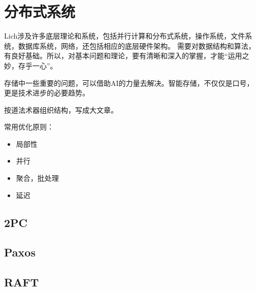 \chapter{分布式系统}

Lich涉及许多底层理论和系统，包括并行计算和分布式系统，操作系统，文件系统，数据库系统，网络，还包括相应的底层硬件架构。
需要对数据结构和算法，有良好基础。所以，对基本问题和理论，要有清晰和深入的掌握，才能“运用之妙，存乎一心”。

存储中一些重要的问题，可以借助AI的力量去解决。智能存储，不仅仅是口号，更是技术进步的必要趋势。

按道法术器组织结构，写成大文章。

常用优化原则：
\begin{itemize}
    \item 局部性
    \item 并行
    \item 聚合，批处理
    \item 延迟
\end{itemize}

\section{2PC}

\section{Paxos}
\section{RAFT}

